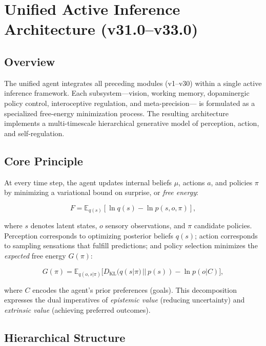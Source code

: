 \documentclass[9pt]{elife}
\begin{document}
\section{Unified Active Inference Architecture (v31.0–v33.0)}

\subsection{Overview}

The unified agent integrates all preceding modules (v1–v30) within a single
active inference framework. Each subsystem—vision, working memory,
dopaminergic policy control, interoceptive regulation, and meta-precision—
is formulated as a specialized free-energy minimization process.
The resulting architecture implements a multi-timescale
hierarchical generative model of perception, action, and self-regulation.

\subsection{Core Principle}

At every time step, the agent updates internal beliefs $\mu$,
actions $a$, and policies $\pi$ by minimizing a variational bound
on surprise, or \textit{free energy}:

\begin{equation}
F = \mathbb{E}_{q(s)}[\ln q(s) - \ln p(s,o,\pi)] ,
\end{equation}

where $s$ denotes latent states, $o$ sensory observations, and $\pi$
candidate policies.  Perception corresponds to optimizing posterior
beliefs $q(s)$; action corresponds to sampling sensations that fulfill
predictions; and policy selection minimizes the \textit{expected}
free energy $G(\pi)$:

\begin{equation}
G(\pi) = \mathbb{E}_{q(o,s|\pi)} \big[
D_{\mathrm{KL}}(q(s|\pi)\,||\,p(s))
 - \ln p(o|C)
\big],
\end{equation}

where $C$ encodes the agent’s prior preferences (goals).
This decomposition expresses the dual imperatives of
\textit{epistemic value} (reducing uncertainty) and
\textit{extrinsic value} (achieving preferred outcomes).

\subsection{Hierarchical Structure}
\end{document}
